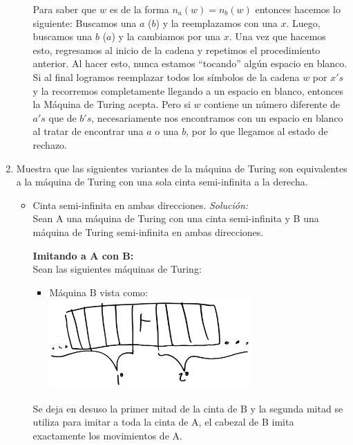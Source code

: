 \documentclass[letterpaper,10pt]{article}
\begin{document}
\begin{enumerate}
\begin{itemize}
            Para saber que $w$ es de la forma $n_a(w) = n_b(w)$ entonces 
            hacemos lo siguiente: Buscamos una $a$ ($b$) y la reemplazamos 
            con una $x$. Luego, buscamos una $b$ ($a$) y la cambiamos por
            una $x$. Una vez que hacemos esto, regresamos al inicio de la 
            cadena y repetimos el procedimiento anterior. Al hacer esto, nunca 
            estamos ``tocando'' algún espacio en blanco. Si al final logramos
            reemplazar todos los símbolos de la cadena $w$ por $x's$ y la
            recorremos completamente llegando a un espacio en blanco, 
            entonces la Máquina de Turing acepta. Pero si $w$ contiene  un
            número diferente de $a's$ que de $b's$, necesariamente nos 
            encontramos con un espacio en blanco al tratar de encontrar una
            $a$ o una $b$, por lo que llegamos al estado de rechazo.
       \end{itemize}
       
       \newpage
       \item Muestra que las siguientes variantes de la máquina de Turing son
       equivalentes a la máquina de Turing con una sola cinta semi-infinita a la
       derecha.
       \begin{itemize}
           
           \item Cinta semi-infinita en ambas direcciones.
            \textit{Solución:}\\ 
           		Sean A una máquina de Turing con una cinta semi-infinita y B una máquina de Turing semi-infinita en ambas direcciones.  
           		
           \textbf{Imitando a A con B:}\\
           		Sean las siguientes máquinas de Turing:\\
           		\begin{itemize}
           			\item Máquina B vista como:\\
           				\includegraphics[width=220pt]{./images/img1.JPG}\\
           		\end{itemize}
           		Se deja en desuso la primer mitad de la cinta de B y la segunda mitad se utiliza para imitar a toda la cinta de A, el cabezal de B imita exactamente los movimientos de A.


\end{itemize}
\end{enumerate}
\end{document}
